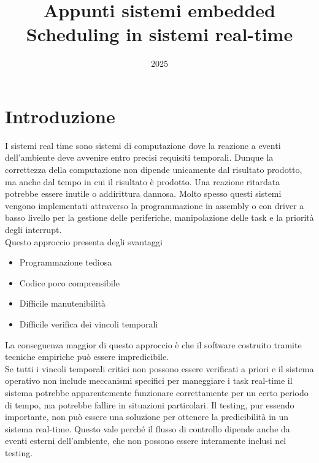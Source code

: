 \documentclass[12pt]{article}
\title{Appunti sistemi embedded \\ Scheduling in sistemi real-time}
\author{}
\date{2025}
\begin{document}
\maketitle
\tableofcontents
\newpage
\section{Introduzione}

I sistemi real time sono sistemi di computazione dove la reazione a eventi dell'ambiente deve avvenire entro precisi requisiti temporali.
Dunque la correttezza della computazione non dipende unicamente dal risultato prodotto, ma anche dal tempo in cui il risultato è prodotto.
Una reazione ritardata potrebbe essere inutile o addirittura dannosa.
Molto spesso questi sistemi vengono implementati attraverso la programmazione in assembly o con driver a basso livello per la gestione delle periferiche, manipolazione delle task 
e la priorità degli interrupt.
\\
Questo approccio presenta degli svantaggi
\begin{itemize}
    \item Programmazione tediosa
    \item Codice poco comprensibile
    \item Difficile manutenibilità
    \item Difficile verifica dei vincoli temporali
\end{itemize}
La conseguenza maggior di questo approccio è che il software costruito tramite tecniche empiriche può  essere impredicibile.\\
Se tutti i vincoli temporali critici non possono essere verificati a priori e il sistema operativo non include meccanismi specifici per maneggiare i task real-time
il sistema potrebbe apparentemente funzionare correttamente per un certo periodo di tempo, ma potrebbe fallire in situazioni particolari.
Il testing, pur essendo importante, non può essere una soluzione per ottenere la predicibilità in un sistema real-time. Questo vale perché 
il flusso di controllo dipende anche da eventi esterni dell'ambiente, che non possono essere interamente inclusi nel testing.
\end{document}
